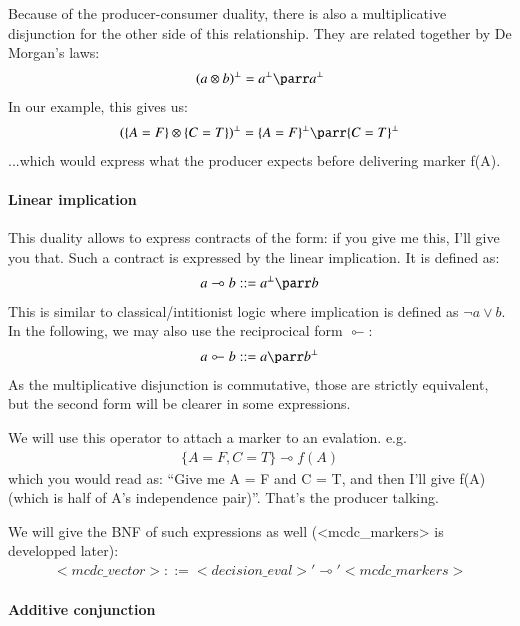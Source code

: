 \documentclass[a4paper,12pt,twoside]{article}
\begin{document}
Because of the producer-consumer duality, there is also a multiplicative
disjunction for the other side of this relationship. They are related together
by De Morgan's laws:
\begin{align*}
 (a \otimes b)^\bot = a^\bot \parr a^\bot
\end{align*}
In our example, this gives us:
\begin{align*}
 (\{A=F\} \otimes \{C=T\})^\bot = \{A=F\}^\bot \parr \{C=T\}^\bot
\end{align*}
...which would express what the producer expects before delivering marker
f(A).

\paragraph{Linear implication}

This duality allows to express contracts of the form: if you give me
this, I'll give you that. Such a contract is expressed by the
linear implication. It is defined as:
\begin{align*}
  a \multimap b ::= a^\bot \parr b
\end{align*}
This is similar to classical/intitionist logic where implication is
defined as $\neg a \vee b$.  In the following, we may also use the
reciprocical form $\multimapinv$:
\begin{align*}
  a \multimapinv b ::= a \parr b^\bot
\end{align*}
As the multiplicative disjunction is commutative, those are strictly
equivalent, but the second form will be clearer in some expressions.

We will use this operator to attach a marker to an evalation. e.g.
\begin{align*}
  \{A=F, C=T\} \multimap f(A)
\end{align*}
which you would read as: ``Give me A = F and C = T, and then I'll give f(A)
(which is half of A's independence pair)''. That's the producer talking.

We will give the BNF of such expressions as well (<mcdc\_markers> is
developped later):
\begin{align*}
<mcdc\_vector> ::= <decision\_eval> '\multimap' <mcdc\_markers>
\end{align*}

\paragraph{Additive conjunction}
\end{document}

